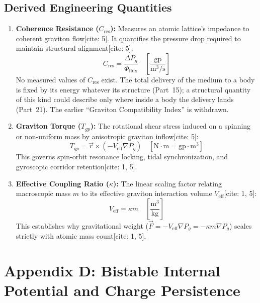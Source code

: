 \documentclass[12pt, a4paper]{article}
\begin{document}
\subsection{Derived Engineering Quantities}

\begin{enumerate}
    \item \textbf{Coherence Resistance ($C_{\text{res}}$):} Measures an atomic lattice's impedance to coherent graviton flow[cite: 5]. It quantifies the pressure drop required to maintain structural alignment[cite: 5]:
    \begin{equation}
    C_{\text{res}} = \frac{\Delta P_g}{\Phi_{\text{flux}}} \quad \left[\frac{\text{gp}}{\text{m}^3/\text{s}}\right]
    \end{equation}
    No measured values of $C_{\text{res}}$ exist. The total delivery of the medium to a body is fixed by its energy whatever its structure (Part~15); a structural quantity of this kind could describe only where inside a body the delivery lands (Part~21). The earlier ``Graviton Compatibility Index'' is withdrawn.

    \item \textbf{Graviton Torque ($T_{gp}$):} The rotational shear stress induced on a spinning or non-uniform mass by anisotropic graviton inflow[cite: 5]:
    \begin{equation}
    T_{gp} = \vec{r} \times (-V_{\text{eff}}\nabla P_g) \quad [\text{N} \cdot \text{m} = \text{gp} \cdot \text{m}^3]
    \end{equation}
    This governs spin-orbit resonance locking, tidal synchronization, and gyroscopic corridor retention[cite: 1, 5].

    \item \textbf{Effective Coupling Ratio ($\kappa$):} The linear scaling factor relating macroscopic mass $m$ to its effective graviton interaction volume $V_{\text{eff}}$[cite: 1, 5]:
    \begin{equation}
    V_{\text{eff}} = \kappa m \quad \left[\frac{\text{m}^3}{\text{kg}}\right]
    \end{equation}
    This establishes why gravitational weight ($\vec{F} = -V_{\text{eff}} \nabla P_g = -\kappa m \nabla P_g$) scales strictly with atomic mass count[cite: 1, 5].
\end{enumerate}


\section{Appendix D: Bistable Internal Potential and Charge Persistence}
\label{app:F}
\end{document}
